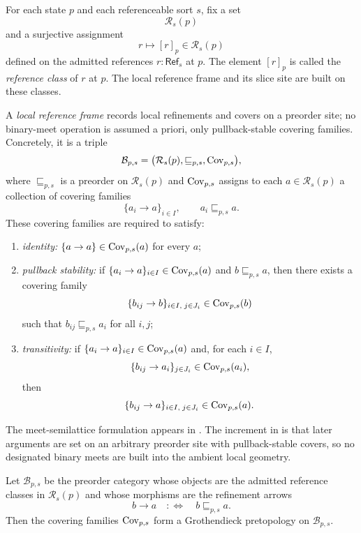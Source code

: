 \begin{definition}\label{def:reference-classes}
For each state $p$ and each referenceable sort $s$, fix a set
\[
\mathcal R_s(p)
\]
and a surjective assignment
\[
r\longmapsto [r]_p\in \mathcal R_s(p)
\]
defined on the admitted references $r:\mathsf{Ref}_s$ at $p$. The element $[r]_p$ is called the \emph{reference class} of $r$ at $p$. The local reference frame and its slice site are built on these classes.
\end{definition}

\begin{definition}\label{def:local-reference-frame}
A \emph{local reference frame} records local refinements and covers on a preorder site; no binary-meet operation is assumed a priori, only pullback-stable covering families. Concretely, it is a triple
\[
\mathcal{B}_{p,s}=\bigl(\mathcal{R}_s(p),\sqsubseteq_{p,s},\mathrm{Cov}_{p,s}\bigr),
\]
where $\sqsubseteq_{p,s}$ is a preorder on $\mathcal{R}_s(p)$ and $\mathrm{Cov}_{p,s}$ assigns to each $a\in\mathcal{R}_s(p)$ a collection of covering families
\[
\{a_i\to a\}_{i\in I},
\qquad
a_i\sqsubseteq_{p,s} a.
\]
These covering families are required to satisfy:
\begin{enumerate}[label=(\roman*),nosep]
\item \emph{identity:} $\{a\to a\}\in\mathrm{Cov}_{p,s}(a)$ for every $a$;
\item \emph{pullback stability:} if $\{a_i\to a\}_{i\in I}\in\mathrm{Cov}_{p,s}(a)$ and $b\sqsubseteq_{p,s} a$, then there exists a covering family
\[
\{b_{ij}\to b\}_{i\in I,\;j\in J_i}\in\mathrm{Cov}_{p,s}(b)
\]
such that $b_{ij}\sqsubseteq_{p,s} a_i$ for all $i,j$;
\item \emph{transitivity:} if $\{a_i\to a\}_{i\in I}\in\mathrm{Cov}_{p,s}(a)$ and, for each $i\in I$,
\[
\{b_{ij}\to a_i\}_{j\in J_i}\in\mathrm{Cov}_{p,s}(a_i),
\]
then
\[
\{b_{ij}\to a\}_{i\in I,\;j\in J_i}\in\mathrm{Cov}_{p,s}(a).
\]
\end{enumerate}
\end{definition}

\begin{remark}
The meet-semilattice formulation appears in \cite[Definition~4.3]{MaZhang2026ConditionalGluingFailure}. The increment in  is that later arguments are set on an arbitrary preorder site with pullback-stable covers, so no designated binary meets are built into the ambient local geometry.
\end{remark}

\begin{proposition}\label{prop:local-reference-pretopology}
Let $\mathcal{B}_{p,s}$ be the preorder category whose objects are the admitted reference classes in $\mathcal{R}_s(p)$ and whose morphisms are the refinement arrows
\[
b\to a
\quad:\Longleftrightarrow\quad
b\sqsubseteq_{p,s} a.
\]
Then the covering families $\mathrm{Cov}_{p,s}$ form a Grothendieck pretopology on $\mathcal{B}_{p,s}$.
\end{proposition}

